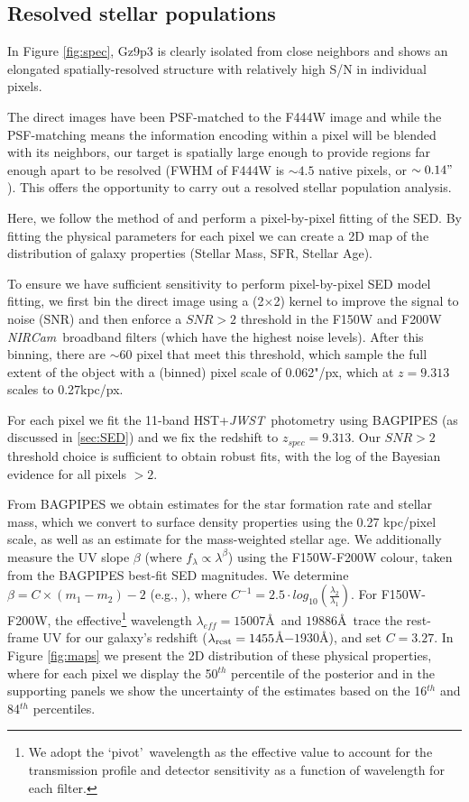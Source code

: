 \documentclass[sn-mathphys]{sn-jnl}%
\theoremstyle{thmstyleone}%
\theoremstyle{thmstyletwo}%
\theoremstyle{thmstylethree}%
\newcommand{\jwst}{\textit{JWST}}
\newcommand{\NIRCam}{\textit{NIRCam}}
\begin{document}
\subsection{Resolved stellar populations} \label{sec:spatial_resolved_SEDs}

In Figure \ref{fig:spec}, Gz9p3 is clearly isolated from close neighbors and shows an elongated spatially-resolved structure with relatively high S/N in individual pixels. 

The direct images have been PSF-matched to the F444W image and while the PSF-matching means the information encoding within a pixel will be blended with its neighbors, our target is spatially large enough to provide regions far enough apart to be resolved (FWHM of F444W is $\sim4.5$ native pixels, or $\sim0.14"$). This offers the opportunity to carry out a resolved stellar population analysis.

Here, we follow the method of \cite{Gimenez-Arteaga22} and perform a pixel-by-pixel fitting of the SED. By fitting the physical parameters for each pixel we can create a 2D map of the distribution of galaxy properties (Stellar Mass, SFR, Stellar Age).

To ensure we have sufficient sensitivity to perform pixel-by-pixel SED model fitting, we first bin the direct image using a (2$\times$2) kernel to improve the signal to noise (SNR) and then enforce a $SNR>2$ threshold in the F150W and F200W \NIRCam\ broadband filters (which have the highest noise levels). After this binning, there are $\sim60$ pixel that meet this threshold, which sample the full extent of the object with a (binned) pixel scale of 0.062"/px, which at $z=9.313$ scales to 0.27kpc/px.

For each pixel we fit the 11-band HST+\jwst\ photometry using BAGPIPES (as discussed in \ref{sec:SED}) and we fix the redshift to $z_{spec}=9.313$. Our $SNR>2$ threshold choice is sufficient to obtain robust fits, with the log of the Bayesian evidence for all pixels $>2$.

From BAGPIPES we obtain estimates for the star formation rate and stellar mass, which we convert to surface density properties using the 0.27 kpc/pixel scale, as well as an estimate for the mass-weighted stellar age. 
We additionally measure the UV slope $\beta$ (where $f_\lambda\propto\lambda^{\beta}$) using the F150W-F200W colour, taken from the BAGPIPES best-fit SED magnitudes.
We determine $\beta = C\times (m_{1} - m_{2}) - 2$ (e.g., \cite{Dunlop13}), where $C^{-1}=2.5\cdot log_{10}(\frac{\lambda_2}{\lambda_1})$. For F150W-F200W, the effective\footnote{We adopt the \lq pivot\rq\ wavelength as the effective value to account for the transmission profile and detector sensitivity as a function of wavelength for each filter.} wavelength $\lambda_{eff}=15007$\AA\ and $19886$\AA\ trace the rest-frame UV for our galaxy's redshift ($\lambda_{\rm rest}=1455$\AA$-1930$\AA), and set $C=3.27$. 
In Figure \ref{fig:maps} we present the 2D distribution of these physical properties, where for each pixel we display the 50$^{th}$ percentile of the posterior and in the supporting panels we show the uncertainty of the estimates based on the 16$^{th}$ and 84$^{th}$ percentiles.
\end{document}
